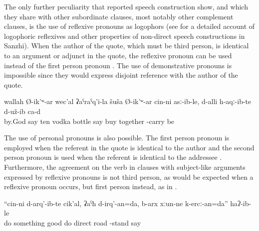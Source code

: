 The only further peculiarity that reported speech construction show, and which they share with other subordinate clauses, most notably other complement clauses, is the use of reflexive pronouns as logophors (see \citealp{ForkerSubmittedb} for a detailed account of logophoric reflexives and other properties of non-direct speech constructions in Sanzhi). When the author of the quote, which must be third person, is identical to an argument or adjunct in the quote, the reflexive pronoun can be used instead of the first person pronoun . The use of demonstrative pronouns is impossible since they would express disjoint reference with the author of the quote.
%
\begin{exe}
	\ex	\label{ex:‎‎‎By God, he said that he himself had bought 10 bottles of vodka; and apparently he had brought them with him}
	\gll	wallah		Ø-ik'ʷ-ar	wec'al	ʡaˁraˁq'i-la	šuša	Ø-ik'ʷ-ar	cin-ni	asː-ib-le,	d-alli	h-aqː-ib-te	d-už-ib	ca-d	\\
		by.God say	ten	vodka	bottle	say		buy	together	-carry 	be	\\
	\glt	{}
\end{exe}

The use of personal pronouns is also possible. The first person pronoun is employed when the referent in the quote is identical to the author  and the second person pronoun is used when the referent is identical to the addressee . Furthermore, the agreement on the verb in clauses with subject-like arguments expressed by reflexive pronouns is not third person, as would be expected when a reflexive pronoun occurs, but first person instead, as in .
%
\begin{exe}
	\ex	\label{ex:‎(He said,) The things that I have done, I will repair (make better), I will be on the right road}
	\gll	``cin-ni	d-arq'-ib-te	cik'al,	ʡaˁħ	d-irq'-an=da,	b-arx	xːun-ne	k-ercː-an=da''	haʔ-ib-le\\
			do something	good	do	direct	road	-stand	say\\
	\glt	{}
\end{exe}

